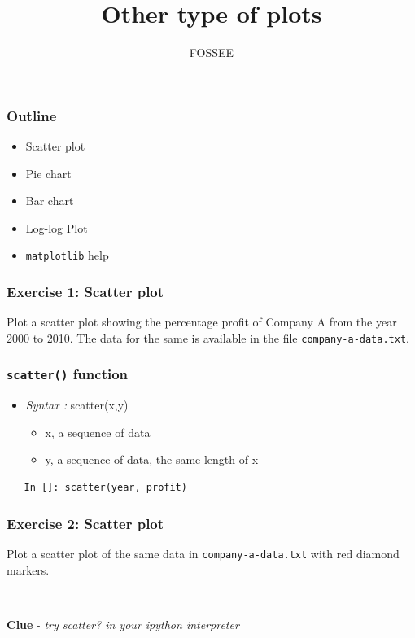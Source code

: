 \documentclass[presentation]{beamer}
\title{Other type of plots}
\author{FOSSEE}
\date{}
\begin{document}
\maketitle









\begin{frame}
\frametitle{Outline}
\label{sec-1}

\begin{itemize}
\item Scatter plot
\item Pie chart
\item Bar chart
\item Log-log Plot
\item \texttt{matplotlib} help
\end{itemize}
\end{frame}
\begin{frame}
\frametitle{Exercise 1: Scatter plot}
\label{sec-2}

  Plot a scatter plot showing the percentage profit of Company A from the year 2000
  to 2010. The data for the same is available in the file \texttt{company-a-data.txt}.
\end{frame}
\begin{frame}[fragile]
\frametitle{\texttt{scatter()} function}
\label{sec-3}

\begin{itemize}
\item \emph{Syntax :} scatter(x,y)

\begin{itemize}
\item x, a sequence of data
\item y, a sequence of data, the same length of x
\end{itemize}

\end{itemize}

\begin{verbatim}
   In []: scatter(year, profit)
\end{verbatim}
\end{frame}
\begin{frame}[fragile]
\frametitle{Exercise 2: Scatter plot}
\label{sec-4}

  Plot a scatter plot of the same data in \texttt{company-a-data.txt} with red diamond markers.
\begin{verbatim}
   
\end{verbatim}

  \textbf{Clue} - \emph{try scatter? in your ipython interpreter}
\end{frame}
\end{document}
